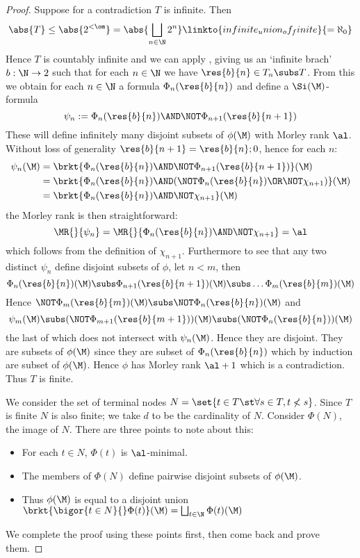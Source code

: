 \begin{proof}
    Suppose for a contradiction $T$ is infinite.
    Then 
    \[\abs{T} \leq \abs{2^{<\om}} = \abs{\bigsqcup_{n \in \N} 2^n} 
    \linkto{infinite_union_of_finite}{= \aleph_0}\]
    Hence $T$ is countably infinite and we can apply 
    ,
    giving us an `infinite brach' $b : \N \to 2$ such that for each $n \in \N$
    we have $\res{b}{n} \in T_n \subs T$.
    From this we obtain for each $n \in \N$ a formula $\Phi_n(\res{b}{n})$
    and define a $\Si(\M)$-formula
    \[\psi_n := \Phi_n(\res{b}{n}) \AND \NOT \Phi_{n+1}(\res{b}{n+1})\]
    These will define infinitely many disjoint subsets of $\phi(\M)$
    with Morley rank $\al$.
    Without loss of generality $\res{b}{n+1} = \res{b}{n};0$, 
    hence for each $n$:
    \begin{align*}
        \psi_n(\M) &
        = \brkt{\Phi_n(\res{b}{n}) \AND \NOT \Phi_{n+1}(\res{b}{n+1})}(\M)\\
        &= \brkt{\Phi_n(\res{b}{n}) \AND 
        (\NOT \Phi_{n}(\res{b}{n}) \OR \NOT \chi_{n+1})}(\M)\\
        &= \brkt{\Phi_n(\res{b}{n}) \AND \NOT \chi_{n+1}}(\M)
    \end{align*}
    the Morley rank is then straightforward:
    \[\MR{}{\psi_n} = \MR{}{\Phi_n(\res{b}{n}) \AND \NOT \chi_{n+1}} = \al\]
    which follows from the definition of $\chi_{n+1}$.
    Furthermore to see that any two distinct $\psi_n$ define disjoint 
    subsets of $\phi$, let $n < m$, then 
    \[\Phi_{n}(\res{b}{n})(\M) \subs \Phi_{n+1}(\res{b}{n+1})(\M) \subs 
    \dots \Phi_{m}(\res{b}{m})(\M)\]
    Hence 
    $\NOT \Phi_{m}(\res{b}{m})(\M) \subs \NOT \Phi_n(\res{b}{n})(\M)$ and
    \[
        \psi_m(\M) \subs (\NOT \Phi_{m+1}(\res{b}{m+1}))(\M)
        \subs (\NOT \Phi_{n}(\res{b}{n}))(\M)
    \]
    the last of which does not intersect with $\psi_n(\M)$.
    Hence they are disjoint.
    They are subsets of $\phi(\M)$ since they are subset of 
    $\Phi_n(\res{b}{n})$ which by induction are subset of $\phi(\M)$.
    Hence $\phi$ has Morley rank $\al + 1$ which is a contradiction.
    Thus $T$ is finite.

    We consider the set of terminal nodes 
    $N = \set{t \in T \st \forall s \in T, t \nless s}$.
    Since $T$ is finite $N$ is also finite;
    we take $d$ to be the cardinality of $N$.
    Consider $\Phi(N)$, the image of $N$.
    There are three points to note about this: 
    \begin{itemize}
        \item For each $t \in N$, $\Phi(t)$ is $\al$-minimal.
        \item The members of $\Phi(N)$ define pairwise disjoint subsets of 
            $\phi(\M)$.
        \item Thus $\phi(\M)$ is equal to a disjoint union
            $\brkt{\bigor{t \in N}{} \Phi(t)}(\M) = 
            \bigsqcup_{t \in \N} \Phi(t)(\M)$
    \end{itemize}
    We complete the proof using these points first, 
    then come back and prove them.


\end{proof}
